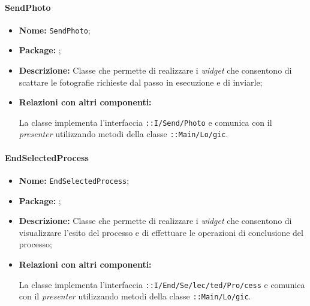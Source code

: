 \paragraph{SendPhoto}
\begin{flushleft}
\begin{itemize}
\item \textbf{Nome:} \texttt{SendPhoto};
\item \textbf{Package:} \texttt{\viewAdmin{}};
\item \textbf{Descrizione:} Classe che permette di realizzare i \textit{widget} che consentono di scattare le fotografie richieste dal passo in esecuzione e di inviarle;
\item \textbf{Relazioni con altri componenti:}
\begin{sloppypar}
La classe implementa l'interfaccia \texttt{\iViewUser{}::I\fshyp{}Send\fshyp{}Photo} e comunica con il \textit{presenter} utilizzando metodi della classe \texttt{\logicUser{}::Main\fshyp{}Lo\fshyp{}gic}.
\end{sloppypar}
\end{itemize}
\end{flushleft}

\paragraph{EndSelectedProcess}
\begin{flushleft}
\begin{itemize}
\item \textbf{Nome:} \texttt{EndSelectedProcess};
\item \textbf{Package:} \texttt{\viewAdmin{}};
\item \textbf{Descrizione:} Classe che permette di realizzare i \textit{widget} che consentono di visualizzare l'esito del processo e di effettuare le operazioni di conclusione del processo;
\item \textbf{Relazioni con altri componenti:}
\begin{sloppypar}
La classe implementa l'interfaccia \texttt{\iViewUser{}::I\fshyp{}End\fshyp{}Se\fshyp{}lec\fshyp{}ted\fshyp{}Pro\fshyp{}cess} e comunica con il \textit{presenter} utilizzando metodi della classe \texttt{\logicUser{}::Main\fshyp{}Lo\fshyp{}gic}.
\end{sloppypar}
\end{itemize}
\end{flushleft}

